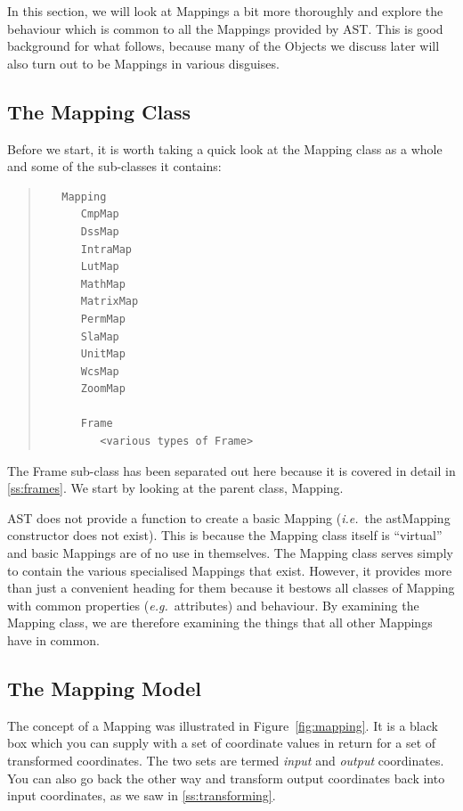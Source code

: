 \documentclass[twoside,11pt]{article}
\newcommand{\htmlref}[2]{#1}
\newcommand{\secref}[1]{\S\ref{#1}}
\renewcommand{\secref}[1]{\ref{#1}}
\begin{document}
In this section, we will look at Mappings a bit more thoroughly and
explore the behaviour which is common to all the Mappings provided by
AST.  This is good background for what follows, because many of the
Objects we discuss later will also turn out to be Mappings in various
disguises.

\subsection{\label{ss:mappingclass}The Mapping Class}

Before we start, it is worth taking a quick look at the \htmlref{Mapping}{Mapping} class
as a whole and some of the sub-classes it contains:

\begin{quote}
\begin{verbatim}
   Mapping
      CmpMap
      DssMap
      IntraMap
      LutMap
      MathMap
      MatrixMap
      PermMap
      SlaMap
      UnitMap
      WcsMap
      ZoomMap

      Frame
         <various types of Frame>
\end{verbatim}
\end{quote}

The \htmlref{Frame}{Frame} sub-class has been separated out here because it is covered
in detail in \secref{ss:frames}. We start by looking at the parent
class, Mapping.

AST does not provide a function to create a basic Mapping
({\em{i.e.}}\ the astMapping constructor does not exist). This is
because the Mapping class itself is ``virtual'' and basic Mappings are
of no use in themselves. The Mapping class serves simply to contain
the various specialised Mappings that exist.
However, it provides more than just a convenient heading for them
because it bestows all classes of Mapping with common properties
({\em{e.g.}}\ attributes) and behaviour.  By examining the Mapping
class, we are therefore examining the things that all other Mappings
have in common.

\subsection{The Mapping Model}

The concept of a \htmlref{Mapping}{Mapping} was illustrated in Figure~\ref{fig:mapping}.
It is a black box which you can supply with a set of coordinate values
in return for a set of transformed coordinates. The two sets are
termed {\em{input}} and {\em{output}} coordinates. You can also go
back the other way and transform output coordinates back into input
coordinates, as we saw in \secref{ss:transforming}.
\end{document}

